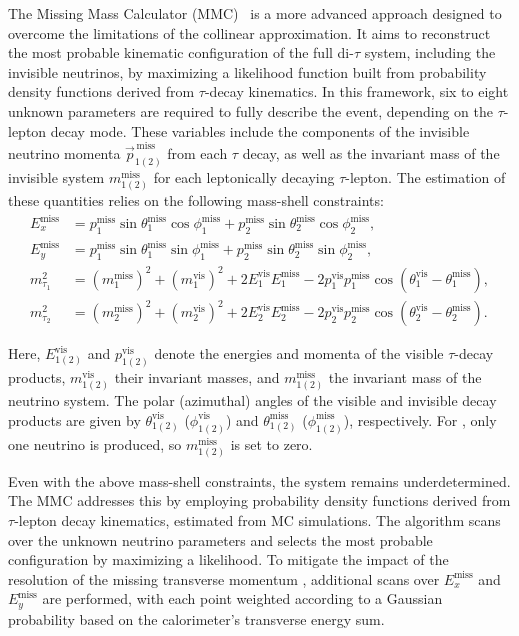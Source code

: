 The Missing Mass Calculator (MMC)~\cite{Elagin_2011} is a more advanced approach designed to overcome the limitations of the collinear approximation. It aims to reconstruct the most probable kinematic configuration of the full di-$\tau$ system, including the invisible neutrinos, by maximizing a likelihood function built from probability density functions derived from $\tau$-decay kinematics. In this framework, six to eight unknown parameters are required to fully describe the event, depending on the $\tau$-lepton decay mode. These variables include the components of the invisible neutrino momenta $\vec{p}^{\,\text{miss}}_{1(2)}$ from each $\tau$ decay, as well as the invariant mass of the invisible system $m^{\text{miss}}_{1(2)}$ for each leptonically decaying $\tau$-lepton. The estimation of these quantities relies on the following mass-shell constraints:
\begin{align}
E_x^{\text{miss}} &= p_1^{\text{miss}} \sin \theta^{\text{miss}}_1 \cos \phi^{\text{miss}}_1 + p_2^{\text{miss}} \sin \theta^{\text{miss}}_2 \cos \phi^{\text{miss}}_2 , \nonumber \\
E_y^{\text{miss}} &= p_1^{\text{miss}} \sin \theta^{\text{miss}}_1 \sin \phi^{\text{miss}}_1 + p_2^{\text{miss}} \sin \theta^{\text{miss}}_2 \sin \phi^{\text{miss}}_2 , \nonumber \\
m_{\tau_1}^2 &= \left(m_1^{\text{miss}}\right)^2 + \left(m_1^{\text{vis}}\right)^2 + 2 E_1^{\text{vis}} E_1^{\text{miss}}
- 2 p_1^{\text{vis}} p_1^{\text{miss}} \cos\left(\theta_1^{\text{vis}} - \theta_1^{\text{miss}}\right) ,  \nonumber \\
m_{\tau_2}^2 &= \left(m_2^{\text{miss}}\right)^2 + \left(m_2^{\text{vis}}\right)^2 + 2 E_2^{\text{vis}} E_2^{\text{miss}}
- 2 p_2^{\text{vis}} p_2^{\text{miss}} \cos\left(\theta_2^{\text{vis}} - \theta_2^{\text{miss}}\right) .
\end{align}

Here, $E^{\text{vis}}_{1(2)}$ and $p^{\text{vis}}_{1(2)}$ denote the energies and momenta of the visible $\tau$-decay products, $m^{\text{vis}}_{1(2)}$ their invariant masses, and $m^{\text{miss}}_{1(2)}$ the invariant mass of the neutrino system. The polar (azimuthal) angles of the visible and invisible decay products are given by $\theta^{\text{vis}}_{1(2)}$ ($\phi^{\text{vis}}_{1(2)}$) and $\theta^{\text{miss}}_{1(2)}$ ($\phi^{\text{miss}}_{1(2)}$), respectively. For \tauhad, only one neutrino is produced, so $m^{\text{miss}}_{1(2)}$ is set to zero.  

Even with the above mass-shell constraints, the system remains underdetermined. The MMC addresses this by employing probability density functions derived from $\tau$-lepton decay kinematics, estimated from MC simulations. The algorithm scans over the unknown neutrino parameters and selects the most probable configuration by maximizing a likelihood. To mitigate the impact of the resolution of the missing transverse momentum \etmiss, additional scans over $E_x^{\text{miss}}$ and $E_y^{\text{miss}}$ are performed, with each point weighted according to a Gaussian probability based on the calorimeter’s transverse energy sum.  

